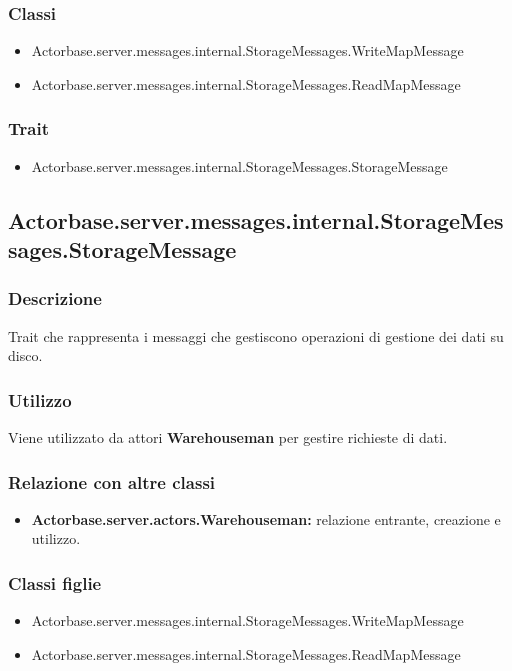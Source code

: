 \documentclass[a4paper]{article}
\begin{document}
			\subsubsection{Classi}
				\begin{itemize}
					\item Actorbase.server.messages.internal.StorageMessages.WriteMapMessage
					\item Actorbase.server.messages.internal.StorageMessages.ReadMapMessage
				\end{itemize}				
				
			\subsubsection{Trait}
				\begin{itemize}
					\item Actorbase.server.messages.internal.StorageMessages.StorageMessage
				\end{itemize}				
				
				
\subsection{Actorbase.server.messages.internal.StorageMessages.StorageMessage}
			\subsubsection{Descrizione}
				Trait che rappresenta i messaggi che gestiscono operazioni di gestione dei dati su disco.
				
			\subsubsection{Utilizzo}
				Viene utilizzato da attori \textbf{Warehouseman} per gestire richieste di dati.
				
			\subsubsection{Relazione con altre classi}
				\begin{itemize}
					\item \textbf{Actorbase.server.actors.Warehouseman:} relazione entrante, creazione e utilizzo.
				\end{itemize}
				
			\subsubsection{Classi figlie}
				\begin{itemize}
					\item Actorbase.server.messages.internal.StorageMessages.WriteMapMessage
					\item Actorbase.server.messages.internal.StorageMessages.ReadMapMessage
				\end{itemize}
\end{document}
